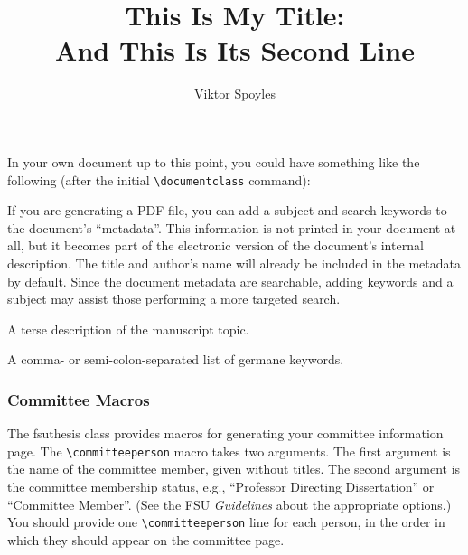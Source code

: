 \documentclass[11pt,letterpaper]{ltxdockit}[2011/03/25]
\newcommand*{\acro}[1]{{\small\textsc{#1}}}
\newcommand*{\booktitle}[1]{\textit{#1}}
\newcommand*{\pkg}[1]{\textsf{#1}}
\newcommand*{\fsuth}{\pkg{fsuthesis}}
\renewcommand{\-}{\discretionary{}{}{}}
\newenvironment*{macrolist}
  {\list{}{%
      \setlength{\labelwidth}{1.5in}
      \setlength{\labelsep}{10pt}
      \setlength{\leftmargin}{0pt}
      \setlength{\parsep}{0pt}
      \setlength{\listparindent}{\parindent}
      \renewcommand*{\makelabel}[1]{{\setbox0=\hbox{\parbox[t]{1.5in}{\raggedleft\leavevmode\marglistfont##1}}\dp0=0pt\box0}}}}
  {\endlist}
\def\cmditem#1{\cmd{#1}\\}
\def\macroitems#1{\item[\listofitems{\cmditem}{#1}]}
\def\margcmds#1{\leavevmode\marginpar{\raggedleft\leavevmode\marglistfont\listofitems{\cmditem}{#1}}\ignorespaces}
\begin{document}
\noindent 
In your own document up to this point, you could have something like the
following (after the initial \verb|\documentclass| command):
\begin{ltxexample}
\title{This Is My Title:\protect\\ And This Is Its Second Line}
\author{Viktor Spoyles}
\end{ltxexample}

If you are generating a \acro{PDF} file, you can add a subject and
search keywords to the document's ``metadata''. This
information is not printed in your document at all, but it becomes
part of the electronic version of the document's internal
description. The title and author's name will already be included in
the metadata by default.  Since the document metadata are searchable,
adding keywords and a subject may assist those performing a more
targeted search.
\begin{macrolist}
\macroitems{subject}
A terse description of the manuscript
topic.

\macroitems{keywords}
A comma- or semi-colon-separated list of germane
keywords.

\begin{ltxexample}
\subject{FTL Propulsion Theory}
\end{ltxexample}

\end{macrolist}

\subsubsection{Committee Macros}

\margcmds{committeeperson}
The \fsuth{} class provides macros for generating your committee
information page.  The
\verb|\committeeperson|
macro takes two arguments.  The first argument is the name of the
committee member, given without titles.  The second argument is the
committee membership status, e.g., ``Professor Directing
Dissertation'' or ``Committee Member''.  (See the FSU
\booktitle{Guidelines} about the appropriate options.)  You should
provide one \verb|\committeeperson| line for each person, in the order
in which they should appear on the committee page.
\begin{ltxexample}
\end{ltxexample}
\end{document}
